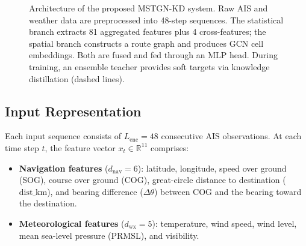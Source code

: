 \documentclass[conference]{IEEEtran}
\begin{document}
\begin{figure}[t]
\caption{Architecture of the proposed MSTGN-KD system. Raw AIS and weather data are preprocessed into 48-step sequences. The statistical branch extracts 81 aggregated features plus 4 cross-features; the spatial branch constructs a route graph and produces GCN cell embeddings. Both are fused and fed through an MLP head. During training, an ensemble teacher provides soft targets via knowledge distillation (dashed lines).}
\label{fig:architecture}
\end{figure}

\subsection{Input Representation}

Each input sequence consists of $L_{\text{enc}} = 48$ consecutive AIS observations.
At each time step $t$, the feature vector $x_t \in \mathbb{R}^{11}$ comprises:

\begin{itemize}
    \item \textbf{Navigation features} ($d_{\text{nav}} = 6$): latitude, longitude, speed over ground (SOG), course over ground (COG), great-circle distance to destination ($\text{dist\_km}$), and bearing difference ($\Delta\theta$) between COG and the bearing toward the destination.
    \item \textbf{Meteorological features} ($d_{\text{wx}} = 5$): temperature, wind speed, wind level, mean sea-level pressure (PRMSL), and visibility.
\end{itemize}
\end{document}
